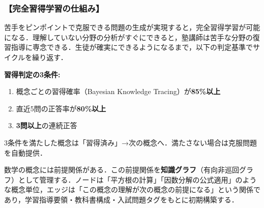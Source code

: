 \documentclass[paper=a4,fontsize=10.5bp,jafontsize=10.5bp,twocolumn]{jlreq}
\begin{document}
\subsubsection{【完全習得学習の仕組み】}

苦手をピンポイントで克服できる問題の生成が実現すると，完全習得学習が可能になる．理解していない分野の分析がすぐにできると，塾講師は苦手な分野の復習指導に専念できる．生徒が確実にできるようになるまで，以下の判定基準でサイクルを繰り返す．

\begin{graybox}
\textbf{習得判定の3条件:}
\begin{enumerate}[leftmargin=2em]
  \item 概念ごとの習得確率（Bayesian Knowledge Tracing）が\textbf{85\%以上}
  \item 直近5問の正答率が\textbf{80\%以上}
  \item \textbf{3問以上}の連続正答
\end{enumerate}
3条件を満たした概念は「習得済み」→次の概念へ．満たさない場合は克服問題を自動提供．
\end{graybox}

数学の概念には前提関係がある．この前提関係を\textbf{知識グラフ}（有向非巡回グラフ）として管理する．ノードは「平方根の計算」「因数分解の公式適用」のような概念単位，エッジは「この概念の理解が次の概念の前提になる」という関係であり，学習指導要領・教科書構成・入試問題タグをもとに初期構築する．
\end{document}
